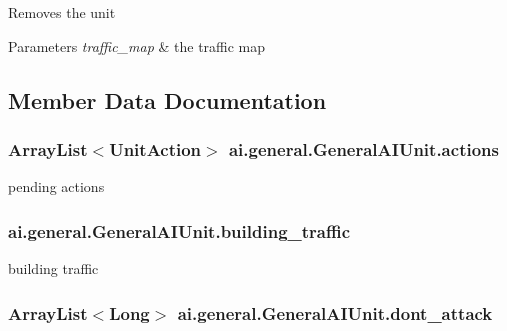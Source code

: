 \label{classai_1_1general_1_1_general_a_i_unit_aba187b9ebb1878e80dd69f85b91baa2f}
Removes the unit 
\begin{DoxyParams}{Parameters}
{\em traffic\_\-map} & the traffic map \\
\hline
\end{DoxyParams}


\subsection{Member Data Documentation}
\hypertarget{classai_1_1general_1_1_general_a_i_unit_ac94f90e9827f597b1c8bf50b43b5fe7c}{
\subsubsection[{actions}]{\setlength{\rightskip}{0pt plus 5cm}ArrayList$<${\bf UnitAction}$>$ {\bf ai.general.GeneralAIUnit.actions}}}
\label{classai_1_1general_1_1_general_a_i_unit_ac94f90e9827f597b1c8bf50b43b5fe7c}
pending actions \hypertarget{classai_1_1general_1_1_general_a_i_unit_ac262c8c9b55bc82b722f58fcc52b087e}{
\subsubsection[{building\_\-traffic}]{ {\bf ai.general.GeneralAIUnit.building\_\-traffic}}}
\label{classai_1_1general_1_1_general_a_i_unit_ac262c8c9b55bc82b722f58fcc52b087e}
building traffic \hypertarget{classai_1_1general_1_1_general_a_i_unit_a27d57b02a0a0c05eead8d64031551a77}{
\subsubsection[{dont\_\-attack}]{\setlength{\rightskip}{0pt plus 5cm}ArrayList$<$Long$>$ {\bf ai.general.GeneralAIUnit.dont\_\-attack}}}
\label{classai_1_1general_1_1_general_a_i_unit_a27d57b02a0a0c05eead8d64031551a77}
